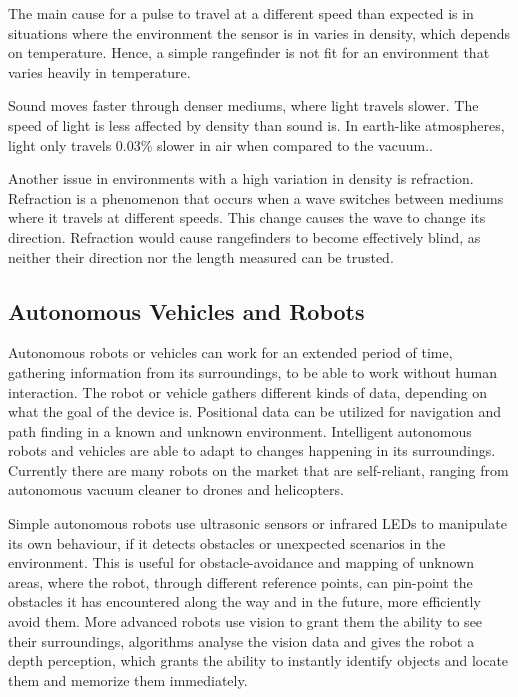 The main cause for a pulse to travel at a different speed than expected is in situations where the environment the sensor is in varies in density, which depends on temperature\cite{refraction}. Hence, a simple rangefinder is not fit for an environment that varies heavily in temperature.

Sound moves faster through denser mediums, where light travels slower. The speed of light is less affected by density than sound is. In earth-like atmospheres, light only travels 0.03\% slower in air when compared to the vacuum.\cite{refraction}\cite{speedOfSound}.

Another issue in environments with a high variation in density is refraction. Refraction is a phenomenon that occurs when a wave switches between mediums where it travels at different speeds. This change causes the wave to change its direction. %
Refraction would cause rangefinders to become effectively blind, as neither their direction nor the length measured can be trusted.

\clearpage
\subsection{Autonomous Vehicles and Robots}

Autonomous robots or vehicles can work for an extended period of time, gathering information from its surroundings, to be able to work without human interaction. The robot or vehicle gathers different kinds of data, depending on what the goal of the device is. Positional data can be utilized for navigation and path finding in a known and unknown environment. Intelligent autonomous robots and vehicles are able to adapt to changes happening in its surroundings.
Currently there are many robots on the market that are self-reliant, ranging from autonomous vacuum cleaner to drones and helicopters\cite{autonomousbasic}.

Simple autonomous robots use ultrasonic sensors or infrared LEDs to manipulate its own behaviour, if it detects obstacles or unexpected scenarios in the environment. This is useful for obstacle-avoidance and mapping of unknown areas, where the robot, through different reference points, can pin-point the obstacles it has encountered along the way and in the future, more efficiently avoid them.
More advanced robots use vision to grant them the ability to see their surroundings, algorithms analyse the vision data and gives the robot a depth perception, which grants the ability to instantly identify objects and locate them and memorize them immediately\cite{obstacles}.

